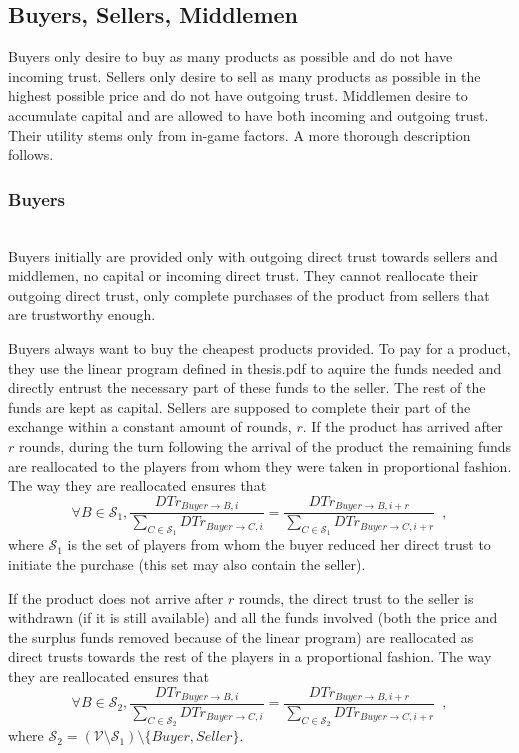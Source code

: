 \subsection{Buyers, Sellers, Middlemen}
  Buyers only desire to buy as many products as possible and do not have incoming trust. Sellers only desire to sell as many
  products as possible in the highest possible price and do not have outgoing trust. Middlemen desire to accumulate capital
  and are allowed to have both incoming and outgoing trust. Their utility stems only from in-game factors. A more thorough
  description follows.

  \subsubsection{Buyers} \ \\

    Buyers initially are provided only with outgoing direct trust towards sellers and middlemen, no capital or incoming direct
    trust. They cannot reallocate their outgoing direct trust, only complete purchases of the product from sellers that are
    trustworthy enough.
    
    Buyers always want to buy the cheapest products provided. To pay for a product, they use the linear program defined in
    thesis.pdf to aquire the funds needed and directly entrust the necessary part of these funds to the seller. The rest of
    the funds are kept as capital. Sellers are supposed to complete their part of the exchange within a constant amount of
    rounds, $r$. If the product has arrived after $r$ rounds, during the turn following the arrival of the product the
    remaining funds are reallocated to the players from whom they were taken in proportional fashion. The way they are
    reallocated ensures that
    \begin{equation*}
      \forall B \in \mathcal{S}_1, \frac{DTr_{Buyer \rightarrow B, i}}{\sum\limits_{C \in \mathcal{S}_1}DTr_{Buyer \rightarrow
      C, i}} = \frac{DTr_{Buyer \rightarrow B, i + r}}{\sum\limits_{C \in \mathcal{S}_1}DTr_{Buyer \rightarrow C, i + r}}
      \enspace,
    \end{equation*}
    where $\mathcal{S}_1$ is the set of players from whom the buyer reduced her direct trust to initiate the purchase (this
    set may also contain the seller).

    If the product does not arrive after $r$ rounds, the direct trust to the seller is withdrawn (if it is still available)
    and all the funds involved (both the price and the surplus funds removed because of the linear program) are reallocated as
    direct trusts towards the rest of the players in a proportional fashion. The way they are reallocated ensures that
    \begin{equation*}
      \forall B \in \mathcal{S}_2, \frac{DTr_{Buyer \rightarrow B, i}}{\sum\limits_{C \in \mathcal{S}_2}DTr_{Buyer \rightarrow
      C, i}} = \frac{DTr_{Buyer \rightarrow B, i + r}}{\sum\limits_{C \in \mathcal{S}_2}DTr_{Buyer \rightarrow C, i + r}}
      \enspace,
    \end{equation*}
    where $\mathcal{S}_2 = \left(\mathcal{V} \setminus \mathcal{S}_1\right) \setminus{\{Buyer, Seller\}}$.

